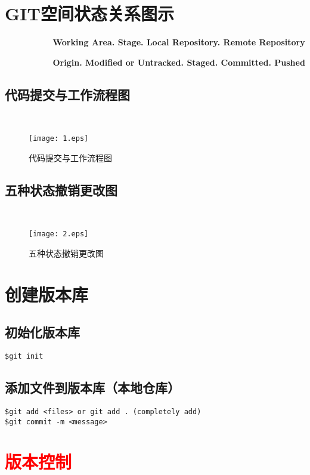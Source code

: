 \section{GIT空间状态关系图示}

\textbf{~~~~~~~~~~Working Area.  Stage.  Local Repository.  Remote Repository}

\textbf{~~~~~~~~~~Origin.  Modified or Untracked.  Staged.  Committed.  Pushed}

\subsection{代码提交与工作流程图}

~


\begin{figure}[!h]
  \centering
  \texttt{[image: 1.eps]}
  \caption{代码提交与工作流程图}
\end{figure}


\subsection{五种状态撤销更改图}

~


\begin{figure}[!h]
  \centering
  \texttt{[image: 2.eps]}
  \caption{五种状态撤销更改图}
\end{figure}
\newpage
\section{创建版本库}
\subsection{初始化版本库}
\begin{lstlisting}
$git init
\end{lstlisting}

\subsection{添加文件到版本库（本地仓库）}
\begin{lstlisting}
$git add <files> or git add . (completely add)
$git commit -m <message>
\end{lstlisting}
\section{\textcolor{red}{\textbf{版本控制}}}

